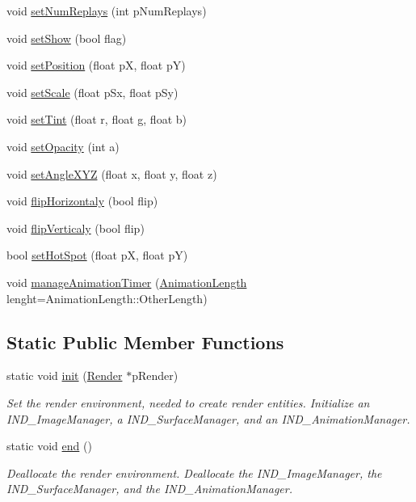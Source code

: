 \begin{DoxyCompactItemize}
void \hyperlink{class_symp_1_1_render_entity_ab6deaa2a7c38603f08d2a5f3117d11a3}{set\-Num\-Replays} (int p\-Num\-Replays)
\item 
void \hyperlink{class_symp_1_1_render_entity_a19ce976bffb402245daba860b7b883c2}{set\-Show} (bool flag)
\item 
void \hyperlink{class_symp_1_1_render_entity_aaab48e2f1a0ffe21c3f9d41140d83b4d}{set\-Position} (float p\-X, float p\-Y)
\item 
void \hyperlink{class_symp_1_1_render_entity_af1921c608cf05ae595a0a1667c0e594b}{set\-Scale} (float p\-Sx, float p\-Sy)
\item 
void \hyperlink{class_symp_1_1_render_entity_a814a076e051dd35318b95b7079eb6259}{set\-Tint} (float r, float g, float b)
\item 
void \hyperlink{class_symp_1_1_render_entity_aa2033131f560efda6c1f7bd801a05721}{set\-Opacity} (int a)
\item 
void \hyperlink{class_symp_1_1_render_entity_a5f1f8c4c4691dd16f2f8f07c658b8e3c}{set\-Angle\-X\-Y\-Z} (float x, float y, float z)
\item 
void \hyperlink{class_symp_1_1_render_entity_a4a6b336b8a835788ae433b16e5944d53}{flip\-Horizontaly} (bool flip)
\item 
void \hyperlink{class_symp_1_1_render_entity_a390e02078053486a376fa28a1ad395aa}{flip\-Verticaly} (bool flip)
\item 
bool \hyperlink{class_symp_1_1_render_entity_a5cda1fcf2807cd5d488257ac97e6e537}{set\-Hot\-Spot} (float p\-X, float p\-Y)
\item 
void \hyperlink{class_symp_1_1_render_entity_a310ff71db866bc621f134b4fc49d55cc}{manage\-Animation\-Timer} (\hyperlink{namespace_symp_a0e94673adb6fed024bf03e95d9cfafba}{Animation\-Length} lenght=Animation\-Length\-::\-Other\-Length)
\end{DoxyCompactItemize}
\subsection*{Static Public Member Functions}
\begin{DoxyCompactItemize}
\item 
static void \hyperlink{class_symp_1_1_render_entity_a023d97c9a548d7172ca25eb454885f41}{init} (\hyperlink{class_symp_1_1_render}{Render} $\ast$p\-Render)
\begin{DoxyCompactList}\small\item\em Set the render environment, needed to create render entities. Initialize an I\-N\-D\-\_\-\-Image\-Manager, a I\-N\-D\-\_\-\-Surface\-Manager, and an I\-N\-D\-\_\-\-Animation\-Manager. \end{DoxyCompactList}\item 
static void \hyperlink{class_symp_1_1_render_entity_ae46c9cd64da0974544a24c718b87a7ed}{end} ()
\begin{DoxyCompactList}\small\item\em Deallocate the render environment. Deallocate the I\-N\-D\-\_\-\-Image\-Manager, the I\-N\-D\-\_\-\-Surface\-Manager, and the I\-N\-D\-\_\-\-Animation\-Manager. \end{DoxyCompactList}\end{DoxyCompactItemize}
